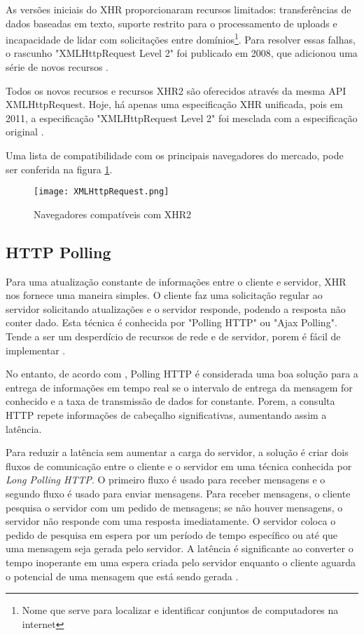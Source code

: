 \begin{citacao}
	As versões iniciais do XHR proporcionaram recursos limitados: transferências de dados baseadas em texto, suporte restrito para o processamento de uploads e incapacidade de lidar com solicitações entre domínios\footnote{Nome que serve para localizar e identificar conjuntos de computadores na internet}. Para resolver essas falhas, o rascunho "XMLHttpRequest Level 2" foi publicado em 2008, que adicionou uma série de novos recursos \cite[P.~262-263]{grigorik2013high}.
\end{citacao}

Todos os novos recursos e recursos XHR2 são oferecidos através da mesma API XMLHttpRequest. Hoje, há apenas uma especificação XHR unificada, pois em 2011, a especificação "XMLHttpRequest Level 2" foi mesclada com a especificação original \cite{grigorik2013high}.

Uma lista de compatibilidade com os principais navegadores do mercado, pode ser conferida na figura \ref{fig:xhr2}.

\begin{figure}[!htb]
	\centering
	\texttt{[image: XMLHttpRequest.png]}
	\caption{Navegadores compatíveis com XHR2}
	\label{fig:xhr2}
\end{figure}

\subsection{HTTP Polling}

Para uma atualização constante de informações entre o cliente e servidor, XHR nos fornece uma maneira simples. O cliente faz uma solicitação regular ao servidor solicitando atualizações e o servidor responde, podendo a resposta não conter dado. Esta técnica é conhecida por "Polling HTTP" ou "Ajax Polling". Tende a ser um desperdício de recursos de rede e de servidor, porem é fácil de implementar \cite{mccarthy2009comet}.

No entanto, de acordo com , Polling HTTP é considerada uma boa solução para a entrega de informações em tempo real se o intervalo de entrega da mensagem for conhecido e  a taxa de transmissão de dados for constante. Porem, a consulta HTTP repete informações de cabeçalho significativas, aumentando assim a latência.

Para reduzir a latência sem aumentar a carga do servidor, a solução é criar dois fluxos de comunicação entre o cliente e o servidor em uma técnica conhecida por \emph{Long Polling HTTP}. O primeiro fluxo é usado para receber mensagens e o segundo fluxo é usado para enviar mensagens. Para receber mensagens, o cliente pesquisa o servidor com um pedido de mensagens; se não houver mensagens, o servidor não responde com uma resposta imediatamente. O servidor coloca o pedido de pesquisa em espera por um período de tempo específico ou até que uma mensagem seja gerada pelo servidor. A latência é significante ao converter o tempo inoperante em uma espera criada pelo servidor enquanto o cliente aguarda o potencial de uma mensagem que está sendo gerada \cite{gross2006introduction}.


